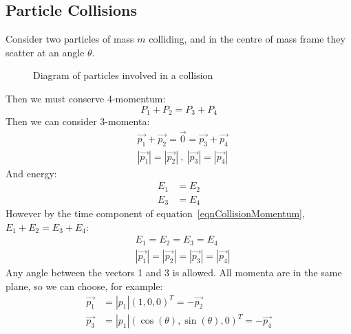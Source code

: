\documentclass[../Main.tex]{subfiles}
\begin{document}
\subsection{Particle Collisions}
Consider two particles of mass $m$ colliding, and in the centre of mass frame they scatter at an angle $\theta$.
\begin{figure}[ht]
    \centering
    \caption{Diagram of particles involved in a collision}
    \label{figParticleCollision}
\end{figure}
Then we must conserve 4-momentum:
\begin{equation}
    P_1 + P_2 = P_3 + P_4
    \label{eqnCollisionMomentum}
\end{equation}
Then we can consider 3-momenta:
\begin{align*}
    &\vec{p_1} + \vec{p_2} = \vec{0} = \vec{p_3} + \vec{p_4} \\
    &|\vec{p_1}| = |\vec{p_2}|~,~|\vec{p_3}| = |\vec{p_4}|
\end{align*}
And energy:
\begin{align*}
    E_1 &= E_2 \\
    E_3 &= E_4
\end{align*}
However by the time component of equation~\ref{eqnCollisionMomentum}, $E_1 + E_2 = E_3 + E_4$:
\begin{align*}
    &E_1 = E_2 = E_3 = E_4 \\
    &|\vec{p_1}| = |\vec{p_2}| = |\vec{p_3}| = |\vec{p_4}|
\end{align*}
Any angle between the vectors 1 and 3 is allowed. All momenta are in the same plane, so we can choose, for example:
\begin{align*}
    \vec{p_1} &= |p_1| (1, 0, 0)^T = -\vec{p_2} \\
    \vec{p_3} &= |p_1| (\cos(\theta), \sin(\theta), 0)^T = -\vec{p_4} \\
\end{align*}
\end{document}

